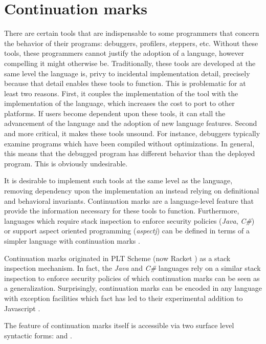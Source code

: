 \documentclass[ms,electronic,twosidetoc,letterpaper,chaptercenter,parttop]{byumsphd}
\begin{document}
\chapter{Continuation marks}

There are certain tools that are indispensable to some programmers that concern the
behavior of their programs: debuggers, profilers, steppers, etc. Without these tools,
these programmers cannot justify the adoption of a language, however compelling it might
otherwise be. Traditionally, these tools are developed at the same level the 
language is, privy to incidental implementation detail, precisely because that detail 
enables these tools to function. This is problematic for at least two reasons. First, 
it couples the implementation of the tool with the implementation of the language, which
increases the cost to port to other platforms. If users become dependent upon these tools,
it can stall the advancement of the language and the adoption of new language features.
Second and more critical, it makes these tools unsound. For instance, debuggers typically
examine programs which have been compiled without optimizations. In general, this means 
that the debugged program has different behavior than the deployed program. This is 
obviously undesirable.

It is desirable to implement such tools at the same level as the language, removing
dependency upon the implementation an instead relying on definitional and behavioral
invariants. Continuation marks are a language-level feature that provide the information
necessary for these tools to function. Furthermore, languages which require stack
inspection to enforce security policies (\emph{Java}, \emph{C\#}) or support aspect
oriented programming (\emph{aspectj}) can be defined in terms of a simpler language with
continuation marks \cite{clements2004tail}.

Continuation marks originated in PLT Scheme (now Racket \cite{plt-tr1}) as a stack 
inspection mechanism. In fact, the \emph{Java} and \emph{C\#} languages rely on a similar 
stack inspection to enforce security policies of which continuation marks can be seen as 
a generalization. Surprisingly, continuation marks can be encoded in any language with 
exception facilities \cite{pettyjohn2005continuations} which fact has led to their 
experimental addition to Javascript \cite{clements2008implementing}.

The feature of continuation marks itself is accessible via two surface level syntactic
forms:  and .
\end{document}

